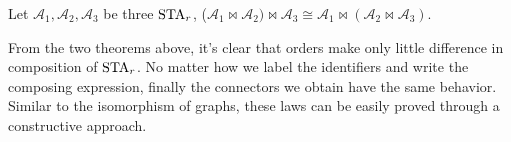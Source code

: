 \begin{theorem}[Associative]
\label{thm:associative}
Let $\mathscr{A}_1, \mathscr{A}_2, \mathscr{A}_3$ be three $\mbox{STA}_r$, ($\mathscr{A}_{1}\bowtie \mathscr{A}_{2})\bowtie \mathscr{A}_{3}\cong\mathscr{A}_{1}\bowtie(\mathscr{A}_{2}\bowtie \mathscr{A}_{3})$.
\end{theorem}


From the two theorems above, it's clear that orders make only little difference in composition of $\mbox{STA}_r$. No matter how we label the identifiers and write the composing expression, finally the connectors we obtain have the same behavior. Similar to the isomorphism of graphs, these laws can be easily proved through a constructive approach.
